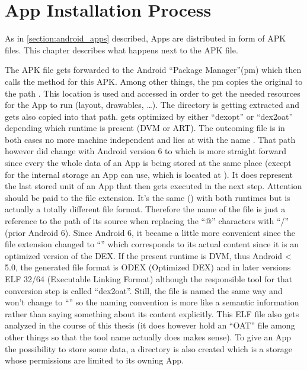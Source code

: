 \section{App Installation Process}\label{section:app_installation}
As in \autoref{section:android_apps} described, Apps are distributed
in form of APK files. This chapter describes what happens next to
the APK file.

The APK file gets forwarded to the Android ``Package Manager''(pm)
which then calls the  method for this
APK. Among other things, the pm copies the original 
to the path .
This location is used and accessed in order to get the
needed resources for the App to run (layout, drawables, \ldots).
The  directory is getting extracted and gets also copied
into that path.  gets optimized by either ``dexopt''
or ``dex2oat'' depending which runtime is present (DVM or ART).
The outcoming file is in both cases no more machine independent
and lies at  with the name
.
That path however did change with Android version 6 to
 which
is more straight forward since every the whole data of an App is being
stored at the same place (except for the internal storage an App can
use, which is located at ).
It does represent the last stored unit of an App that then
gets executed in the next step.
Attention should be paid to the file extension.
It's the same () with both runtimes but is actually a totally
different file format.
Therefore the name of the file is just a reference to the path
of its source when replacing the ``@'' characters with ``/'' (prior Android 6).
Since Android 6, it became a little more convenient since the file extension changed to ``'' which corresponds to its actual content since it is
an optimized version of the DEX.
If the present runtime is DVM, thus Android < 5.0, the generated
file format is ODEX (Optimized DEX) and in later versions
ELF 32/64 (Executable Linking Format) although the responsible
tool for that conversion step is called ``dex2oat''. Still, the file
is named the same way and won't change to ``'' so the naming
convention is more like a semantic information rather than saying something
about its content explicitly.
This ELF file also gets analyzed in the course of this thesis
(it does however hold an ``OAT'' file among other things so that
the tool name actually does makes sense).
To give an App the possibility to
store some data, a  directory is
also created which is a storage whose permissions are limited to its owning
App.

